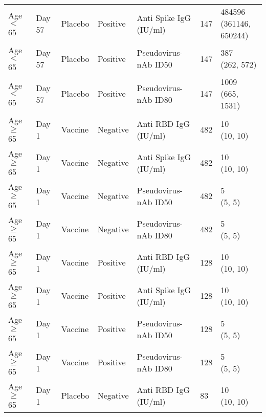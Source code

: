 \documentclass[]{book}
\theoremstyle{definition}
\theoremstyle{definition}
\theoremstyle{definition}
\newcommand{\1}{\mathbbm{1}}
\begin{document}
\begin{landscape}
\begin{ThreePartTable}
\begin{longtable}[t]{>{\raggedright\arraybackslash}p{7cm}llllll}
\hspace{1em}Age $<$ 65 & Day 57 & Placebo & Positive & Anti Spike IgG (IU/ml) & 147 & \makecell[l]{484596\\(361146, 650244)}\\
\hspace{1em}Age $<$ 65 & Day 57 & Placebo & Positive & Pseudovirus-nAb ID50 & 147 & \makecell[l]{387\\(262, 572)}\\
\hspace{1em}Age $<$ 65 & Day 57 & Placebo & Positive & Pseudovirus-nAb ID80 & 147 & \makecell[l]{1009\\(665, 1531)}\\
\hspace{1em}Age $\geq$ 65 & Day 1 & Vaccine & Negative & Anti RBD IgG (IU/ml) & 482 & \makecell[l]{10\\(10, 10)}\\
\hspace{1em}Age $\geq$ 65 & Day 1 & Vaccine & Negative & Anti Spike IgG (IU/ml) & 482 & \makecell[l]{10\\(10, 10)}\\
\hspace{1em}Age $\geq$ 65 & Day 1 & Vaccine & Negative & Pseudovirus-nAb ID50 & 482 & \makecell[l]{5\\(5, 5)}\\
\hspace{1em}Age $\geq$ 65 & Day 1 & Vaccine & Negative & Pseudovirus-nAb ID80 & 482 & \makecell[l]{5\\(5, 5)}\\
\hspace{1em}Age $\geq$ 65 & Day 1 & Vaccine & Positive & Anti RBD IgG (IU/ml) & 128 & \makecell[l]{10\\(10, 10)}\\
\hspace{1em}Age $\geq$ 65 & Day 1 & Vaccine & Positive & Anti Spike IgG (IU/ml) & 128 & \makecell[l]{10\\(10, 10)}\\
\hspace{1em}Age $\geq$ 65 & Day 1 & Vaccine & Positive & Pseudovirus-nAb ID50 & 128 & \makecell[l]{5\\(5, 5)}\\
\hspace{1em}Age $\geq$ 65 & Day 1 & Vaccine & Positive & Pseudovirus-nAb ID80 & 128 & \makecell[l]{5\\(5, 5)}\\
\hspace{1em}Age $\geq$ 65 & Day 1 & Placebo & Negative & Anti RBD IgG (IU/ml) & 83 & \makecell[l]{10\\(10, 10)}\\

\end{longtable}
\end{ThreePartTable}
\end{landscape}
\end{document}
